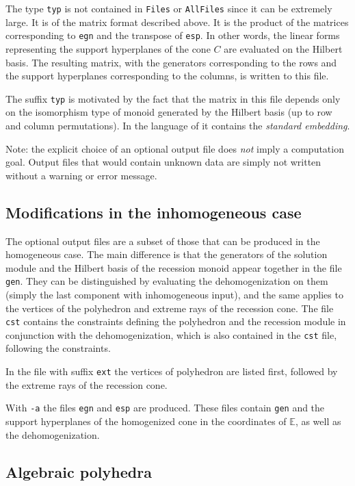\documentclass[12pt,a4paper]{scrartcl}
\theoremstyle{definition}
\def\EE{{\mathbb E}}
\def\ttt{\texttt}
\begin{document}
The type \verb|typ| is not contained in \verb|Files| or \verb|AllFiles| since it can be extremely large. It is of the matrix format described above. It is the product of the matrices
corresponding to \ttt{egn} and the transpose of \ttt{esp}. In other
words, the linear forms representing the support
hyperplanes of the cone $C$ are evaluated on the
Hilbert basis. The resulting matrix, with the
generators corresponding to the rows and the support
hyperplanes corresponding to the columns, is written to
this file.

The suffix \ttt{typ} is motivated by the fact that the
matrix in this file depends only on the isomorphism
type of monoid generated by the Hilbert basis (up to
row and column permutations). In the language of
\cite{BG} it contains the \emph{standard embedding}. 

Note: the explicit choice of an optional output file does \emph{not} imply a computation goal. Output files that would contain unknown data are simply not written without a warning or error message.

\subsection{Modifications in the inhomogeneous case}

The optional output files  are a subset of those that can be produced in the homogeneous
case. The main difference is that the generators of the solution module and the
Hilbert basis of the recession monoid appear together in the file \verb|gen|.
They can be distinguished by evaluating the dehomogenization on them (simply the last component with inhomogeneous input), and the
same applies to the  vertices of the polyhedron and extreme rays of the
recession cone. The file \verb|cst| contains the constraints defining the
polyhedron and the recession module in conjunction with the dehomogenization, which is also contained in the \verb|cst| file, following the constraints.

In the file with suffix \verb|ext| the vertices of polyhedron are listed first, followed by the extreme rays of the recession cone.

With \verb|-a| the files \verb|egn| and \verb|esp| are produced. These files contain \verb|gen| and the support hyperplanes of the homogenized cone in the coordinates of $\EE$, as well as the dehomogenization.

\subsection{Algebraic polyhedra}
\end{document}
